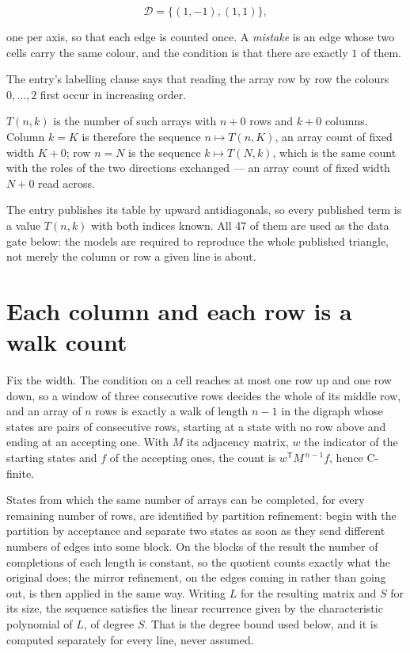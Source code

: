 \documentclass[11pt]{article}
\theoremstyle{definition}
\begin{document}
\[\mathcal{D} = \{(1,-1), (1,1)\},\]

one per axis, so that each edge is counted once. A {\itshape mistake} is an edge whose two cells carry the same colour, and the condition is that there are exactly $1$ of them.

The entry's labelling clause says that reading the array row by row the colours $0,\dots,2$ first occur in increasing order.

$T(n,k)$ is the number of such arrays with $n + 0$ rows and $k + 0$ columns. Column $k = K$ is therefore the sequence $n \mapsto T(n,K)$, an array count of fixed width $K + 0$; row $n = N$ is the sequence $k \mapsto T(N,k)$, which is the same count with the roles of the two directions exchanged --- an array count of fixed width $N + 0$ read across.

The entry publishes its table by upward antidiagonals, so every published term is a value $T(n,k)$ with both indices known. All 47 of them are used as the data gate below: the models are required to reproduce the whole published triangle, not merely the column or row a given line is about.

\section{Each column and each row is a walk count}

Fix the width. The condition on a cell reaches at most one row up and one row down, so a window of three consecutive rows decides the whole of its middle row, and an array of $n$ rows is exactly a walk of length $n-1$ in the digraph whose states are pairs of consecutive rows, starting at a state with no row above and ending at an accepting one. With $M$ its adjacency matrix, $w$ the indicator of the starting states and $f$ of the accepting ones, the count is $w^{\mathsf T}M^{\,n-1}f$, hence C-finite.

States from which the same number of arrays can be completed, for every remaining number of rows, are identified by partition refinement: begin with the partition by acceptance and separate two states as soon as they send different numbers of edges into some block. On the blocks of the result the number of completions of each length is constant, so the quotient counts exactly what the original does; the mirror refinement, on the edges coming in rather than going out, is then applied in the same way. Writing $L$ for the resulting matrix and $S$ for its size, the sequence satisfies the linear recurrence given by the characteristic polynomial of $L$, of degree $S$. That is the degree bound used below, and it is computed separately for every line, never assumed.
\end{document}
